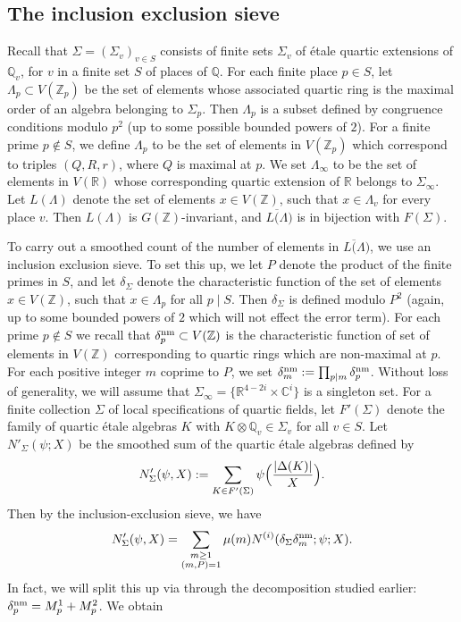 \documentclass{article}
\def\Z{{\mathbb Z}}
\def\nm{{\rm nm}}
\def\R{{\mathbb R}}
\def\Q{{\mathbb Q}}
\def\Z{{\mathbb Z}}
\def\Q{{\mathbb Q}}
\def\C{{\mathbb C}}
\def\ol{\overline}
\begin{document}
\subsection{The inclusion exclusion sieve}
Recall that $\Sigma=(\Sigma_v)_{v\in S}$ consists of finite sets $\Sigma_v$ of \'etale quartic extensions of $\Q_v$, for $v$ in a finite set $S$ of places of $\Q$. For each finite place $p\in S$, let $\Lambda_p\subset V(\Z_p)$ be the set of elements whose associated quartic ring is the maximal order of an algebra belonging to $\Sigma_p$. Then $\Lambda_p$ is a subset defined by congruence conditions modulo $p^2$ (up to some possible bounded powers of $2$).
For a finite prime $p\not\in S$, we define $\Lambda_p$ to be the set of elements in $V(\Z_p)$ which correspond to triples $(Q,R,r)$, where $Q$ is maximal at $p$. We set $\Lambda_\infty$ to be the set of elements in $V(\R)$ whose corresponding quartic extension of $\R$ belongs to $\Sigma_\infty$. Let $L(\Lambda)$ denote the set of elements $x\in V(\Z)$, such that $x\in\Lambda_v$ for every place $v$. Then $L(\Lambda)$ is $G(\Z)$-invariant, and $\ol{L(\Lambda})$ is in bijection with $F(\Sigma)$.


To carry out a smoothed count of the number of elements in $\ol{L(\Lambda})$, we use an inclusion exclusion sieve. To set this up, we let $P$ denote the product of the finite primes in $S$, and let $\delta_{\Sigma}$ denote the characteristic function of the 
set of elements $x\in V(\Z)$, such that $x\in\Lambda_p$ for all $p\mid S$. Then $\delta_{\Sigma}$ is defined modulo $P^2$ (again, up to some bounded powers of $2$ which will not effect the error term).
For each prime $p\not\in S$ we recall that $\delta^{\nm}_p\subset V(\Z)$ is the characteristic function of set of elements in $V(\Z)$ corresponding to quartic rings which are non-maximal at $p$. For each positive integer $m$ coprime to $P$, we set $\delta^{\nm}_m:=\prod_{p\mid m} \delta^{\nm}_p$. Without loss of generality, we will assume that $\Sigma_\infty=\{\R^{4-2i}\times\C^i\}$ is a singleton set. 
For a finite collection $\Sigma$ of local specifications of quartic fields, let $F'(\Sigma)$ denote the family of quartic \'etale algebras $K$ with $K\otimes\Q_v\in\Sigma_v$ for all $v\in S$.
Let $N'_\Sigma(\psi;X)$ be the smoothed sum of the quartic \'etale algebras defined by
\begin{equation}\label{eq:fields_count}
N'_{\Sigma}(\psi,X):=\sum_{K\in F'(\Sigma)}\psi\Bigl(\frac{|\Delta(K)|}{X}\Bigr).
\end{equation}
Then by the inclusion-exclusion sieve, we have
$$N'_{\Sigma}(\psi,X)=\sum_{\substack{m\geq 1\\ (m,P)=1}}\mu(m)N^{(i)}(\delta_\Sigma\delta^{\nm}_m;\psi;X).$$
In fact, we will split this up via through the decomposition studied earlier: $\delta^{\nm}_p=M^1_p+M^2_p$. We obtain
\end{document}
